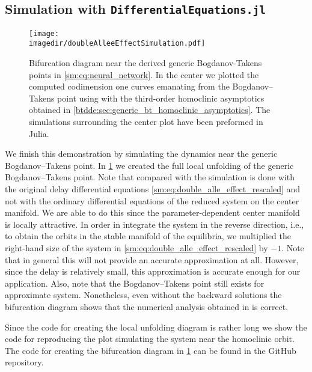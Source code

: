 \subsection{Simulation with {\tt DifferentialEquations.jl}}
%
\begin{figure}[ht!]
    \centering
    \texttt{[image: \\imagedir/doubleAlleeEffectSimulation.pdf]}
    \caption{Bifurcation diagram near the derived generic Bogdanov-Takens
        points in \cref{sm:eq:neural_network}. In the center we plotted the
        computed codimension one curves emanating from the Bogdanov--Takens
        point using \DDEBIFTOOL with the third-order homoclinic asymptotics
        obtained in \cref{btdde:sec:generic_bt_homoclinic_asymptotics}. The simulations
        surrounding the center plot have been preformed in Julia.}
    \label{sm:fig:double_alle_effect-bifurcation-diagram}
\end{figure}
%
We finish this demonstration by simulating the dynamics near the generic
Bogdanov--Takens point. In \cref{sm:fig:double_alle_effect-bifurcation-diagram}
we created the full local unfolding of the generic Bogdanov--Takens point. Note
that compared with \cite{Jiao2021} the simulation is done with the original
delay differential equations \cref{sm:eq:double_alle_effect_rescaled} and not
with the ordinary differential equations of the reduced system on the center
manifold. We are able to do this since the parameter-dependent center manifold
is locally attractive. In order in integrate the system in the reverse direction, i.e.,
to obtain the orbits in the stable manifold of the equilibria, we multiplied 
the right-hand size of the system in \cref{sm:eq:double_alle_effect_rescaled} by $-1$.
Note that in general this will not provide an accurate approximation at all.
However, since the delay is relatively small, this approximation is accurate
enough for our application. Also, note that the Bogdanov--Takens point still
exists for approximate system. Nonetheless, even without the backward solutions
the bifurcation diagram shows that the numerical analysis obtained in
\DDEBIFTOOL is correct.

Since the code for creating the local unfolding diagram is
rather long we show the code for reproducing the plot simulating the system
near the homoclinic orbit. The code for creating the bifurcation diagram in
\cref{sm:fig:double_alle_effect-bifurcation-diagram} can be found in the
GitHub repository.

